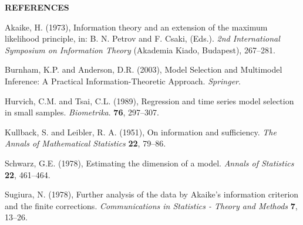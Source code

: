 
\begin{center}
\textbf{REFERENCES}
\end{center}
\singlespace

\phantom{a}

\phantom{a}

\rff Akaike, H. (1973),
     Information theory and an extension of the maximum likelihood principle, in: B. N. Petrov and F. Csaki, (Eds.).
     {\it 2nd International Symposium on Information Theory}
     (Akademia Kiado, Budapest), {267--281}.

\phantom{a}

\rff Burnham, K.P. and Anderson, D.R. (2003),
      Model Selection and Multimodel Inference: A Practical Information-Theoretic Approach.
      {\it Springer}.

\phantom{a}

\rff Hurvich, C.M. and Tsai, C.L. (1989),
      Regression and time series model selection in small samples.
      {\it Biometrika}.
      {\bf 76}, {297--307}.

\phantom{a}

\rff Kullback, S. and Leibler, R. A. (1951),
     On information and sufficiency.
     {\it The Annals of Mathematical Statistics}
     {\bf 22}, {79--86}.

\phantom{a}

\rff Schwarz, G.E. (1978),
      Estimating the dimension of a model.
      {\it Annals of Statistics}
      {\bf 22}, {461--464}.

\phantom{a}

\rff Sugiura, N. (1978),
      Further analysis of the data by Akaike's information criterion and the finite corrections.
      {\it Communications in Statistics - Theory and Methods}
      {\bf 7}, {13--26}.
